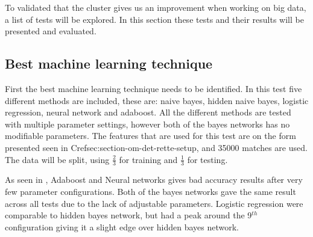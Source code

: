 To validated that the cluster gives us an improvement when working on big data, a list of tests will be explored. In this section these tests and their results will be presented and evaluated.

\subsection{Best machine learning technique}
\usetikzlibrary{arrows,intersections,shapes.geometric,calc}
First the best machine learning technique needs to be identified. In this test five different methods are included, these are: naive bayes, hidden naive bayes, logistic regression, neural network and adaboost. All the different methods are tested with multiple parameter settings, however both of the bayes networks has no modifiable parameters. The features that are used for this test are on the form presented seen in Cref{sec:section-om-det-rette-setup}, and 35000 matches are used. The data will be split, using $\frac{2}{3}$ for training and $\frac{1}{3}$ for testing. 

As seen in , Adaboost and Neural networks gives bad accuracy results after very few parameter configurations. Both of the bayes networks gave the same result across all tests due to the lack of adjustable parameters. Logistic regression were comparable to hidden bayes network, but had a peak around the 9$^{th}$ configuration giving it a slight edge over hidden bayes network.

